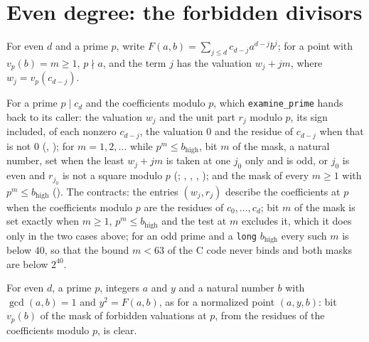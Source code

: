 \section{Even degree: the forbidden divisors}\label{sec:forbidden}

For even $d$ and a prime $p$, write $F(a, b) = \sum_{j \le d} c_{d - j} a^{d - j} b^j$; for a
point with $v_p(b) = m \ge 1$, $p \nmid a$, and the term $j$ has the valuation $w_j + j m$, where
$w_j = v_p(c_{d - j})$.

\begin{definition}\label{def:forbiddenValuations}
  \leanok
  For a prime $p \mid c_d$ and the coefficients modulo $p$, which \verb|examine_prime| hands back to
  its caller: the valuation $w_j$ and the unit part $r_j$ modulo $p$, its sign included, of each
  nonzero $c_{d - j}$, the valuation $0$ and the residue of $c_{d - j}$ when that is not $0$
  (, ); for $m = 1, 2, \dots$
  while $p^m \le b_{\mathrm{high}}$, bit $m$ of the mask, a natural number, set when the least
  $w_j + j m$ is taken at one $j_0$ only and is odd, or $j_0$ is even and $r_{j_0}$ is not a square
  modulo $p$ (; ,
  , ,
  ); and the mask of every $m \ge 1$ with
  $p^m \le b_{\mathrm{high}}$ (). The contracts: the entries
  $(w_j, r_j)$ describe the coefficients at $p$ when the coefficients modulo $p$ are the residues of
  $c_0, \dots, c_d$; bit $m$ of the mask is set exactly when $m \ge 1$, $p^m \le b_{\mathrm{high}}$
  and the test at $m$ excludes it, which it does only in the two cases above; for an odd prime and a
  \verb|long| $b_{\mathrm{high}}$ every such $m$ is below $40$, so that the bound $m < 63$ of the C
  code never binds and both masks are below $2^{40}$.
\end{definition}

\begin{lemma}\label{lem:forbiddenValuations}
  \leanok
  For even $d$, a prime $p$, integers $a$ and $y$ and a natural number $b$ with $\gcd(a, b) = 1$ and
  $y^2 = F(a, b)$, as for a normalized point $(a, y, b)$: bit $v_p(b)$ of the mask of forbidden
  valuations at $p$, from the residues of the coefficients modulo $p$, is clear.
\end{lemma}

